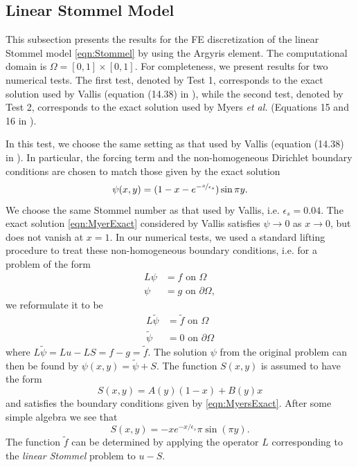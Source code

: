\subsection{Linear Stommel Model} \label{sse:LSM} This subsection presents the
results for the FE discretization of the linear Stommel model
\eqref{eqn:Stommel} by using the Argyris element. The computational domain is
$\Omega = [0,1]\times [0,1]$. For completeness, we present results for two
numerical tests. The first test, denoted by Test 1, corresponds to the exact
solution used by Vallis (equation (14.38) in \cite{Vallis06}), while the second
test, denoted by Test 2, corresponds to the exact solution used by Myers
\emph{et al.} (Equations 15 and 16 in \cite{Myers}).

 In this test, we choose the same setting as that used by Vallis
(equation (14.38) in \cite{Vallis06}).  In particular, the forcing term and the
non-homogeneous Dirichlet boundary conditions are chosen to match those given by
the exact solution
\begin{equation}
  \psi(x,y) = (1-x-e^{-\nicefrac{x}{\epsilon_s}}) \sin \pi y.
  \label{eqn:MyerExact}
\end{equation}
We choose the same Stommel number as that used by Vallis, i.e.
$\epsilon_s=0.04$. The exact solution \eqref{eqn:MyerExact} considered by Vallis
satisfies $\psi \to 0$ as $x \to 0$, but does not vanish at $x=1$. In our
numerical tests, we used a standard lifting procedure to treat these
non-homogeneous boundary conditions, i.e. for a problem of the form
\begin{align*}
  L \psi&=f \text{ on } \Omega\\
  \psi &=g \text{ on } \partial \Omega,
\end{align*}
we reformulate it to be
\begin{align*}
  L\tilde{\psi} &= \tilde{f} \text{ on } \Omega \\
  \tilde{\psi} &= 0 \text{ on } \partial \Omega
\end{align*}
where $L\tilde{\psi} = Lu - LS = f - g = \tilde{f}$. The solution $\psi$ from
the original problem can then be found by $\psi(x,y) =\tilde{\psi}+S$. The
function $S(x,y)$ is assumed to have the form
\begin{equation*}
  S(x,y) = A(y) (1-x) + B(y) x
\end{equation*}
and satisfies the boundary conditions given by \eqref{eqn:MyersExact}. After
some simple algebra we see that
\begin{equation*}
  S(x,y) = -x e^{-x/\epsilon_s}\pi \sin(\pi y).
\end{equation*}
The function $\tilde{f}$ can be determined by applying the operator $L$
corresponding to the \emph{linear Stommel} problem to $u - S$.

